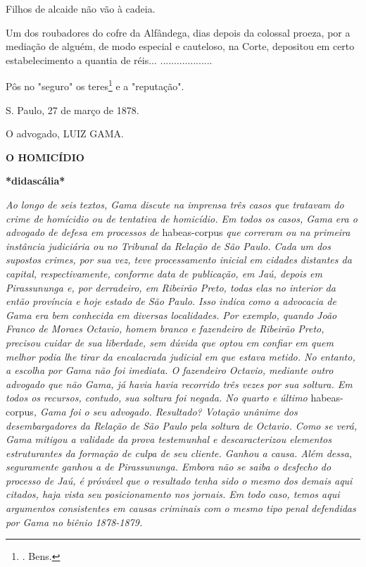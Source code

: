 Filhos de alcaide não vão à cadeia.

Um dos roubadores do cofre da Alfândega, dias depois da colossal proeza,
por a mediação de alguém, de modo especial e cauteloso, na Corte,
depositou em certo estabelecimento a quantia de réis...
...................

Pôs no "seguro" os teres\footnote{. Bens.}
\protect\hypertarget{Secao_Sem_Titulo-29}{}{}e a "reputação".

S. Paulo, 27 de março de 1878.

O advogado, LUIZ GAMA.

\protect\hypertarget{Secao_Sem_Titulo-30}{}{}\textbf{O HOMICÍDIO}

\textbf{*didascália*}

\emph{Ao longo de seis textos, Gama discute na imprensa três casos que
tratavam do crime de homícidio ou de tentativa de homicídio. Em todos os
casos, Gama era o advogado de defesa em processos de} habeas-corpus
\emph{que correram ou na primeira instância judiciária ou no Tribunal da
Relação de São Paulo. Cada um dos supostos crimes, por sua vez, teve
processamento inicial em cidades distantes da capital, respectivamente,
conforme data de publicação, em Jaú, depois em Pirassununga e, por
derradeiro, em Ribeirão Preto, todas elas no interior da então província
e hoje estado de São Paulo. Isso indica como a advocacia de Gama era bem
conhecida em diversas localidades. Por exemplo, quando João Franco de
Moraes Octavio, homem branco e fazendeiro de Ribeirão Preto, precisou
cuidar de sua liberdade, sem dúvida que optou em confiar em quem melhor
podia lhe tirar da encalacrada judicial em que estava metido. No
entanto, a escolha por Gama não foi imediata. O fazendeiro Octavio,
mediante outro advogado que não Gama, já havia havia recorrido três
vezes por sua soltura. Em todos os recursos, contudo, sua soltura foi
negada. No quarto e último} habeas-corpus\emph{, Gama foi o seu
advogado. Resultado? Votação unânime dos desembargadores da Relação de
São Paulo pela soltura de Octavio. Como se verá, Gama mitigou a validade
da prova testemunhal e descaracterizou elementos estruturantes da
formação de culpa de seu cliente. Ganhou a causa. Além dessa,
seguramente ganhou a de Pirassununga. Embora não se saiba o desfecho do
processo de Jaú, é próvável que o resultado tenha sido o mesmo dos
demais aqui citados, haja vista seu posicionamento nos jornais. Em todo
caso, temos aqui argumentos consistentes em causas criminais com o mesmo
tipo penal defendidas por Gama no biênio 1878-1879. }

